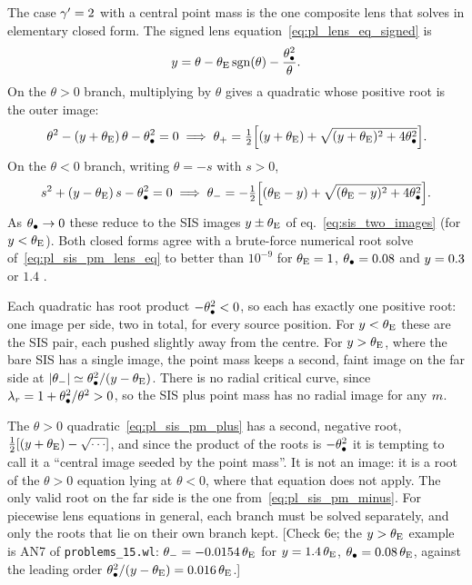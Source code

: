 The case $\gamma'=2$ with a central point mass is the one composite lens
that solves in elementary closed form.  The signed lens
equation~\eqref{eq:pl_lens_eq_signed} is
\begin{equation}
    y = \theta-\theta_{\mathrm{E}}\,\mathrm{sgn}(\theta)-\frac{\theta_{\bullet}^2}{\theta} .
    \label{eq:pl_sis_pm_lens_eq}
\end{equation}
On the $\theta>0$ branch, multiplying by $\theta$ gives a quadratic
whose positive root is the outer image:
\begin{equation}
    \theta^2-(y+\theta_{\mathrm{E}})\,\theta-\theta_{\bullet}^2=0
    \;\Longrightarrow\;
    \theta_+=\tfrac12\Big[(y+\theta_{\mathrm{E}})+\sqrt{(y+\theta_{\mathrm{E}})^2+4\theta_{\bullet}^2}\Big] .
    \label{eq:pl_sis_pm_plus}
\end{equation}
On the $\theta<0$ branch, writing $\theta=-s$ with $s>0$,
\begin{equation}
    s^2+(y-\theta_{\mathrm{E}})\,s-\theta_{\bullet}^2=0
    \;\Longrightarrow\;
    \theta_-=-\tfrac12\Big[(\theta_{\mathrm{E}}-y)+\sqrt{(\theta_{\mathrm{E}}-y)^2+4\theta_{\bullet}^2}\Big] .
    \label{eq:pl_sis_pm_minus}
\end{equation}
As $\theta_{\bullet}\to0$ these reduce to the SIS images $y\pm\theta_{\mathrm{E}}$ of
eq.~\eqref{eq:sis_two_images} (for $y<\theta_{\mathrm{E}}$).  Both closed forms
agree with a brute-force numerical root solve of~\eqref{eq:pl_sis_pm_lens_eq}
to better than $10^{-9}$ for $\theta_{\mathrm{E}}=1$, $\theta_{\bullet}=0.08$ and
$y=0.3$ or $1.4$ .

\begin{keybox}
Each quadratic has root product $-\theta_{\bullet}^2<0$, so each has exactly
one positive root: one image per side, two in total, for every
source position.  For $y<\theta_{\mathrm{E}}$ these are the SIS pair, each
pushed slightly away from the centre.  For $y>\theta_{\mathrm{E}}$, where the
bare SIS has a single image, the point mass keeps a second, faint
image on the far side at $|\theta_-|\simeq\theta_{\bullet}^2/(y-\theta_{\mathrm{E}})$.
There is no radial critical curve, since
$\lambda_r=1+\theta_{\bullet}^2/\theta^2>0$, so the SIS plus point mass has no
radial image for any $m$.
\end{keybox}

\begin{annotation}
The $\theta>0$ quadratic~\eqref{eq:pl_sis_pm_plus} has a second,
negative root, $\tfrac12[(y+\theta_{\mathrm{E}})-\sqrt{\cdots}]$, and since the
product of the roots is $-\theta_{\bullet}^2$ it is tempting to call it a
``central image seeded by the point mass''.  It is not an image: it is
a root of the $\theta>0$ equation lying at $\theta<0$, where that
equation does not apply.  The only valid root on the far side is the
one from~\eqref{eq:pl_sis_pm_minus}.  For piecewise
lens equations in general, each branch must be solved separately, and
only the roots that lie on their own branch kept.  [Check 6e; the $y>\theta_{\mathrm{E}}$ example
is AN7 of \texttt{problems\_15.wl}: $\theta_-=-0.0154\,\theta_{\mathrm{E}}$ for
$y=1.4\,\theta_{\mathrm{E}}$, $\theta_{\bullet}=0.08\,\theta_{\mathrm{E}}$, against the leading
order $\theta_{\bullet}^2/(y-\theta_{\mathrm{E}})=0.016\,\theta_{\mathrm{E}}$.]
\end{annotation}

